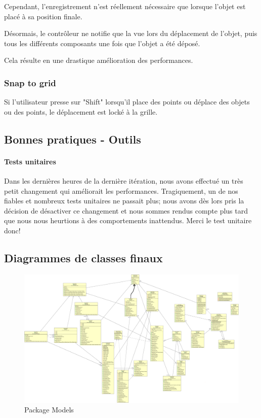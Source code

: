 	Cependant, l'enregistrement n'est réellement nécessaire que lorsque l'objet
	est placé à sa position finale.

	Désormais, le contrôleur ne notifie que la vue lors du déplacement de l'objet,
	puis tous les différents composants une fois que l'objet a été déposé.

	Cela résulte en une drastique amélioration des performances.

	\subsubsection{Snap to grid}
	Si l'utilisateur presse sur "Shift" lorsqu'il place des points ou déplace
	des objets ou des points, le déplacement est locké à la grille.

\subsection{Bonnes pratiques - Outils}

	\paragraph{Tests unitaires}
	Dans les dernières heures de la dernière itération, nous avons effectué un 
	très petit changement qui améliorait les performances. Tragiquement, un de nos
	fiables et nombreux tests unitaires ne passait plus; nous avons dès lors 
	pris la décision de désactiver ce changement et nous sommes rendus compte plus
	tard que nous nous heurtions à des comportements inattendus. Merci le test 
	unitaire donc!

\subsection{Diagrammes de classes finaux}

	\begin{figure}
		\center
		\includegraphics[width=\textwidth]{iteration4/fig/models-final-hand.png}
		\caption{Package Models}
	\end{figure}


